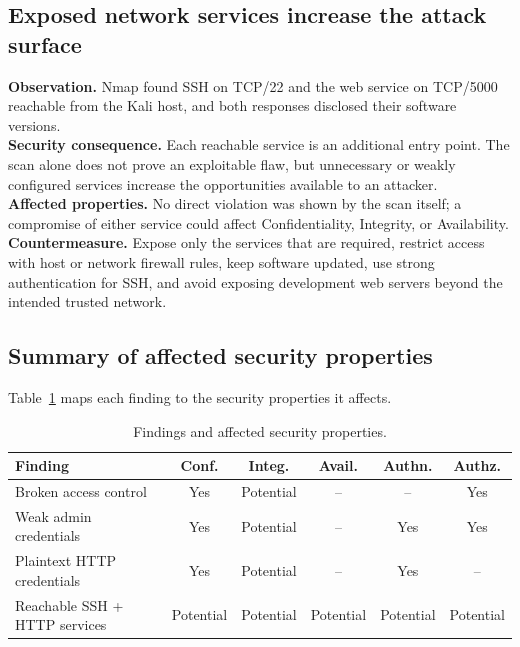 \subsection{Exposed network services increase the attack surface}
\textbf{Observation.} Nmap found SSH on TCP/22 and the web service on TCP/5000
reachable from the Kali host, and both responses disclosed their software
versions.\\
\textbf{Security consequence.} Each reachable service is an additional entry
point. The scan alone does not prove an exploitable flaw, but unnecessary or
weakly configured services increase the opportunities available to an attacker.\\
\textbf{Affected properties.} No direct violation was shown by the scan itself;
a compromise of either service could affect Confidentiality, Integrity, or
Availability.\\
\textbf{Countermeasure.} Expose only the services that are required, restrict
access with host or network firewall rules, keep software updated, use strong
authentication for SSH, and avoid exposing development web servers beyond the
intended trusted network.

\subsection{Summary of affected security properties}

Table~\ref{tab:matrix} maps each finding to the security properties it affects.

\begin{table}[H]
\centering
\caption{Findings and affected security properties.}
\label{tab:matrix}
\small
\begin{tabularx}{\textwidth}{@{}Xccccc@{}}
\toprule
\textbf{Finding} & \textbf{Conf.} & \textbf{Integ.} & \textbf{Avail.} & \textbf{Authn.} & \textbf{Authz.} \\
\midrule
Broken access control          & Yes       & Potential & -- & --        & Yes \\
Weak admin credentials         & Yes       & Potential & -- & Yes       & Yes \\
Plaintext HTTP credentials     & Yes       & Potential & -- & Yes       & --  \\
Reachable SSH + HTTP services  & Potential & Potential & Potential & Potential & Potential \\
\bottomrule
\end{tabularx}
\end{table}


